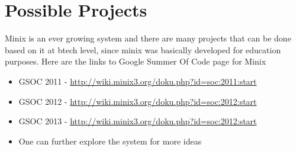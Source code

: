 \section {Possible Projects}
Minix is an ever growing system and there are many projects that can be done based on it at btech level, since minix was basically developed for education purposes. Here are the links to Google Summer Of Code page for Minix

\begin{itemize}
\item GSOC 2011 - \url{http://wiki.minix3.org/doku.php?id=soc:2011:start}
\item GSOC 2012 - \url{http://wiki.minix3.org/doku.php?id=soc:2012:start}
\item GSOC 2013 - \url{http://wiki.minix3.org/doku.php?id=soc:2012:start}
\item One can further explore the system for more ideas
\end{itemize}

